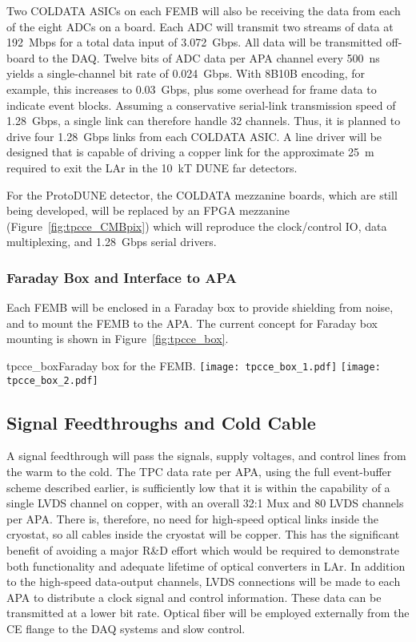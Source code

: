 Two COLDATA ASICs on each FEMB will also be receiving the data from each of the eight ADCs on a board.
Each ADC will transmit two streams of data at 192~Mbps for a total data input of 3.072~Gbps.
All data will be transmitted off-board to the DAQ.
Twelve bits of ADC data per APA channel every 500~ns yields a single-channel bit rate of 0.024~Gbps.
With 8B10B encoding, for example, this increases to 0.03~Gbps, plus some overhead for frame 
data to indicate event blocks.
Assuming a conservative serial-link transmission speed of 1.28~Gbps, 
a single link can therefore handle 32 channels.
Thus, it is planned to drive four 1.28~Gbps links from each COLDATA ASIC.
A line driver will be designed that is capable of driving a copper link for the approximate 25~m required
to exit the LAr in the 10~kT DUNE far detectors.

For the ProtoDUNE detector, the COLDATA mezzanine boards, which are still being developed, will be
replaced by an FPGA mezzanine (Figure~\ref{fig:tpcce_CMBpix}) 
which will reproduce the clock/control IO, data multiplexing, and 1.28~Gbps serial drivers.

%
\subsubsection{Faraday Box and Interface to APA}
\label{subsubsec:faraday_box}

Each FEMB will be enclosed in a Faraday box to provide shielding from noise, and to mount the FEMB 
to the APA. The current concept for Faraday box mounting is shown in Figure~\ref{fig:tpcce_box}.

\begin{cdrfigure}{tpcce_box}{Faraday box for the FEMB.}
\texttt{[image: tpcce\_box\_1.pdf]}
\texttt{[image: tpcce\_box\_2.pdf]}
\end{cdrfigure}


%
\subsection{Signal Feedthroughs and Cold Cable}
\label{subsec:ce_feedthrough}

A signal feedthrough will pass the signals, supply voltages, and control lines from the warm to the cold.
The TPC data rate per APA, using the full event-buffer scheme described earlier,
is sufficiently low that it is within the capability of a single LVDS channel on copper,
with an overall 32:1 Mux and 80 LVDS channels per APA.
There is, therefore, no need for high-speed optical links inside the 
cryostat, so all cables inside the cryostat will be copper.
This has the significant benefit of avoiding a major R\&D effort which would be required to demonstrate
both functionality and adequate lifetime of optical converters in LAr.
In addition to the high-speed data-output channels,
LVDS connections will be made to each APA to distribute a clock signal and control information.
These data can be transmitted at a lower bit rate.
Optical fiber will be employed externally from the CE flange to the DAQ systems and slow control.

